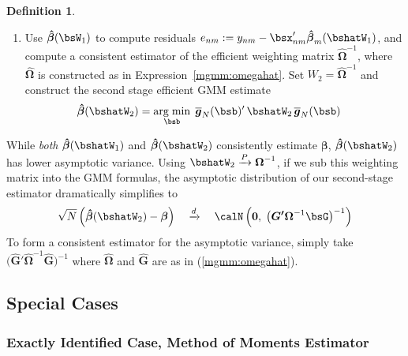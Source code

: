\documentclass[12pt]{article}
\theoremstyle{plain}
\theoremstyle{definition}
\newtheorem{defn}[thm]{Definition}
\theoremstyle{remark}
\newcommand{\bsbeta}{\boldsymbol{\beta}}
\newcommand{\bshatG}{\boldsymbol{\hat{G}}}
\newcommand{\bsOmega}{\boldsymbol{\Omega}}
\newcommand{\bshatbeta}{\boldsymbol{\hat{\beta}}}
\newcommand{\bshatOmega}{\boldsymbol{\hat{\Omega}}}
\newcommand{\bsbarg}{\boldsymbol{\overline{g}}}
\renewcommand{\bso}{\boldsymbol{0}}
\newcommand{\bsGp}{\boldsymbol{G'}}
\DeclareMathOperator*{\argmin}{arg\;min}
\newcommand{\pto}{\xrightarrow{P}}
\newcommand{\dto}{\xrightarrow{d}}
\newcommand{\sumnN}{\sum^N_{n=1}}
\begin{document}
\begin{defn}
\begin{enumerate}[label=(\roman*)]
  \item Use $\bshatbeta(\bsW_1)$ to compute residuals
    $e_{nm} := y_{nm} - \bsx_{nm}'\bshatbeta_m(\bshatW_1)$,
    and compute a consistent estimator of the efficient weighting matrix
    $\bshatOmega^{-1}$, where $\bshatOmega$ is
    constructed as in Expression~\ref{mgmm:omegahat}.
    Set $W_2=\bshatOmega^{-1}$ and construct the second stage efficient
    GMM estimate
    \begin{alignat*}{3}
      \bshatbeta(\bshatW_2) &=
      \argmin_{\bsb}\;
      \bsbarg_N(\bsb)' \, \bshatW_2 \, \bsbarg_N(\bsb)
    \end{alignat*}
\end{enumerate}
While \emph{both} $\bshatbeta(\bshatW_1)$ and $\bshatbeta(\bshatW_2)$
consistently estimate $\bsbeta$, $\bshatbeta(\bshatW_2)$ has lower
asymptotic variance.
Using $\bshatW_2\pto \bsOmega^{-1}$,
if we sub this weighting matrix into the GMM formulas, the
asymptotic distribution of our second-stage estimator dramatically
simplifies to
\begin{align*}
  \sqrt{N}\left(\bshatbeta(\bshatW_2) - \bsbeta\right)
  \quad \dto \quad
  \calN\left(
    \bso,\;
    \big(
    \bsGp
    \bsOmega^{-1}
    \bsG
    \big)^{-1}
  \right)
\end{align*}
To form a consistent estimator for the asymptotic variance, simply
take $\big(\bshatG'\bshatOmega^{-1}\bshatG\big)^{-1}$ where
$\bshatOmega$ and $\bshatG$ are as in (\ref{mgmm:omegahat}).
\end{defn}

\clearpage
\subsection{Special Cases}

\subsubsection{Exactly Identified Case, Method of Moments Estimator}
\end{document}
